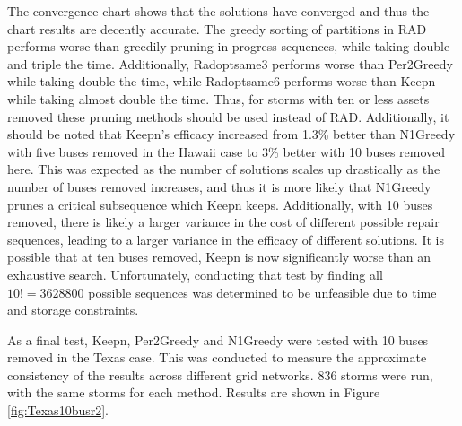 \documentclass[12pt]{article}
\begin{document}
The convergence chart shows that the solutions have converged and thus the chart results are decently accurate. The greedy sorting of partitions in RAD performs worse than greedily pruning in-progress sequences, while taking double and triple the time. Additionally, Radoptsame3 performs worse than Per2Greedy while taking double the time, while Radoptsame6 performs worse than Keepn while taking almost double the time. Thus, for storms with ten or less assets removed these pruning methods should be used instead of RAD. Additionally, it should be noted that Keepn's efficacy increased from 1.3\% better than N1Greedy with five buses removed in the Hawaii case to 3\% better with 10 buses removed here. This was expected as the number of solutions scales up drastically as the number of buses removed increases, and thus it is more likely that N1Greedy prunes a critical subsequence which Keepn keeps. Additionally, with 10 buses removed, there is likely a larger variance in the cost of different possible repair sequences, leading to a larger variance in the efficacy of different solutions. It is possible that at ten buses removed, Keepn is now significantly worse than an exhaustive search. Unfortunately, conducting that test by finding all $10! = 3628800$ possible sequences was determined to be unfeasible due to time and storage constraints. \par

As a final test, Keepn, Per2Greedy and N1Greedy were tested with 10 buses removed in the Texas case. This was conducted to measure the approximate consistency of the results across different grid networks. 836 storms were run, with the same storms for each method. Results are shown in Figure \ref{fig:Texas10busr2}.
\end{document}
